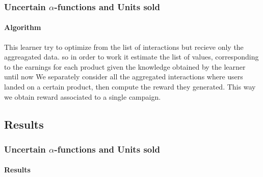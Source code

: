 \documentclass[11pt]{beamer}
\begin{document}
\begin{frame}

\frametitle{Uncertain $\alpha$-functions and Units sold}
\framesubtitle{Algorithm}

This learner try to optimize from the list of interactions but recieve only the aggreagated data.
so in order to work it estimate the list of values, corresponding to the earnings for each product given the knowledge obtained by the learner until now
We separately consider all the aggregated interactions where users landed on a certain product, then compute the reward they generated.
This way we obtain reward associated to a single campaign.

\end{frame}


\subsection{Results}


\begin{frame}

    \frametitle{Uncertain $\alpha$-functions and Units sold}
    \framesubtitle{Results}


\end{frame}







\end{document}
